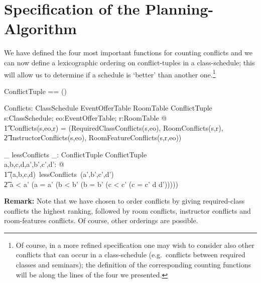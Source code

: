 \documentclass[a4paper]{article}
\begin{document}
\section{Specification of the Planning-Algorithm} 


\vspace{1ex}\noindent 
We have defined the four most important functions for counting conflicts and we
can now define a lexicographic ordering on conflict-tuples in a class-schedule;
this will allow us to determine if a schedule is `better' than another
one.\footnote{Of course, in a more refined specification one may wish to
  consider also other conflicts that can occur in a class-schedule
  (e.g.~conflicts between required classes and seminars); the definition of the
  corresponding counting functions will be along the lines of the four we
  presented.}

\begin{zed}
  ConflictTuple == (\nat \cross \nat \cross \nat \cross \nat) \\
\end{zed}
\begin{axdef}
  Conflicts: ClassSchedule \cross EventOfferTable \cross RoomTable \fun
  ConflictTuple \\
  \where
  \forall s:ClassSchedule; eo:EventOfferTable; r:RoomTable @ \\
  \t1 Conflicts(s,eo,r) = (RequiredClassConflicts(s,eo), RoomConflicts(s,r), \\
  \t2 InstructorConflicts(s,eo), RoomFeatureConflicts(s,r,eo)) \\
\end{axdef}

\begin{axdef}
  \_ lessConflicts \_: ConflictTuple \rel ConflictTuple \\
  \where
  \forall a,b,c,d,a',b',c',d': \nat @ \\
  \t1 (a,b,c,d)~lessConflicts~(a',b',c',d') \iff \\
  \t2 a < a' \lor (a = a' \land (b < b' \lor (b = b' \land (c < c' \lor(c = c'
  \land d \leq d'))))) \\
\end{axdef}

\noindent
{\bf Remark:} Note that we have chosen to order conflicts by giving
required-class conflicts the highest ranking, followed by room conflicts,
instructor conflicts and room-features conflicts. Of course, other orderings are
possible.
\end{document}
